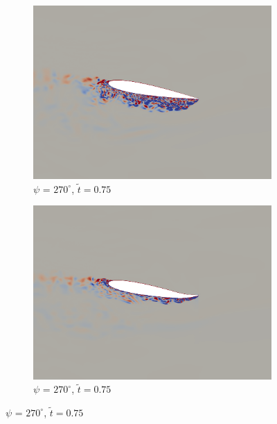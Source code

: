 \begin{figure}[H]
\begin{subfigure}[b]{0.4\textwidth}
	\centering
	\includegraphics[width=1\textwidth]{figures/mu_2pt0/vorticity/baseline/phase_270.png}
	\caption{ $\psi$ = $270^\circ$, $\tilde{t}=0.75$}
	\label{fig:mu_2pt0_non-actuated_psi270}
\end{subfigure}
\begin{subfigure}[b]{0.4\textwidth}
	\centering
	\includegraphics[width=1\textwidth]{figures/mu_2pt0/vorticity/AC/phase_270.png}
	\caption{ $\psi$ = $270^\circ$, $\tilde{t}=0.75$}
	\label{fig:mu_2pt0_AC_psi270}
\end{subfigure}


\end{figure}
